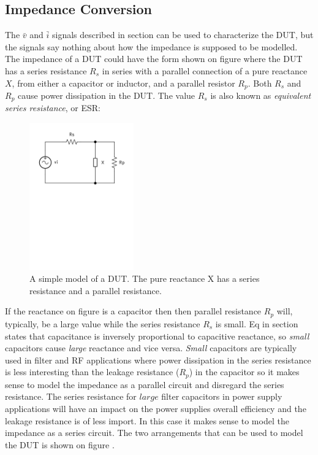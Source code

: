 \subsection{Impedance Conversion} \label{subsec:SeriesToParallel}
The $\bar v$ and $\bar i$ signals described in section  can be used to characterize the DUT, but the signals say nothing about how the impedance is supposed to be modelled. The impedance of a DUT could have the form shown on figure  where the DUT has a series resistance $R_s$ in series with a parallel connection of a pure reactance $X$, from either a capacitor or inductor, and a parallel resistor $R_p$. Both $R_s$ and $R_p$ cause power dissipation in the DUT. The value $R_s$ is also known as \textit{equivalent series resistance}, or ESR:

\begin{figure}[H]
    \centering
    \includegraphics[clip, trim=0 450 0 0, width=0.4\textwidth]{Sections/4_TechnicalAnalysis/Figures/4_1_1_DUTXSeriesParallel.pdf}
    \caption{A simple model of a DUT. The pure reactance X has a series resistance and a parallel resistance.}
    \label{fig:4_1_5_DUTXSeriesParallel}
\end{figure}

If the reactance on figure  is a capacitor then then parallel resistance $R_p$ will, typically, be a large value while the series resistance $R_s$ is small. Eq  in section  states that capacitance is inversely proportional to capacitive reactance, so \textit{small} capacitors cause \textit{large} reactance and vice versa. \textit{Small} capacitors are typically used in filter and RF applications where power dissipation in the series resistance is less interesting than the leakage resistance ($R_p$) in the capacitor so it makes sense to model the impedance as a parallel circuit and disregard the series resistance. The series resistance for $large$ filter capacitors in power supply applications will have an impact on the power supplies overall efficiency and the leakage resistance is of less import. In this case it makes sense to model the impedance as a series circuit. The two arrangements that can be used to model the DUT is shown on figure .

